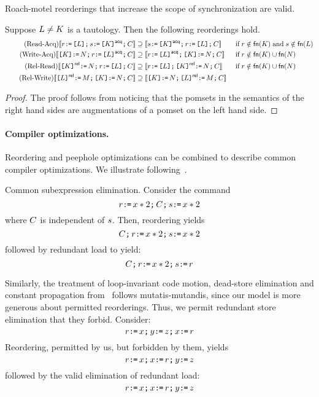 Roach-motel reorderings that increase the scope of synchronization are valid.
\begin{lemma}%
  Suppose $L\neq K$ is a tautology.  Then the following reorderings hold.
  \begin{align*}
    \tag{Read-Acq}
    \llbracket r \texttt{:}\mkern-1mu\texttt{=}\, \texttt{[}L\texttt{]} \texttt{;}\, s \texttt{:}\mkern-1mu\texttt{=}\, \texttt{[}K\texttt{]}^{\mathsf{acq}} \texttt{;}\, C\rrbracket &\supseteq
    \llbracket s \texttt{:}\mkern-1mu\texttt{=}\, \texttt{[}K\texttt{]}^{\mathsf{acq}}\texttt{;}\, r \texttt{:}\mkern-1mu\texttt{=}\, \texttt{[}L\texttt{]} \texttt{;}\, C\rrbracket
&&\;\allowbreak\text{if}\allowbreak\; r\notin\mathsf{fn}(K) \;\allowbreak\text{and}\allowbreak\; s\notin\mathsf{fn}(L)
    \\
    \tag{Write-Acq} 
    \llbracket\texttt{[}K\texttt{]} \texttt{:}\mkern-1mu\texttt{=}\, N \texttt{;}\,r \texttt{:}\mkern-1mu\texttt{=}\, \texttt{[}L\texttt{]}^{\mathsf{acq}} \texttt{;}\,C\rrbracket &\supseteq
    \llbracket r \texttt{:}\mkern-1mu\texttt{=}\, \texttt{[}L\texttt{]}^{\mathsf{acq}}  \texttt{;}\, \texttt{[}K\texttt{]}\texttt{:}\mkern-1mu\texttt{=}\, N \texttt{;}\, C\rrbracket 
    &&\;\allowbreak\text{if}\allowbreak\; r\notin\mathsf{fn}(K) \cup\mathsf{fn}(N)
    \\
\tag{Rel-Read} 
\llbracket\texttt{[}K\texttt{]}^{\mathsf{rel}} \texttt{:}\mkern-1mu\texttt{=}\, N \texttt{;}\,r \texttt{:}\mkern-1mu\texttt{=}\, \texttt{[}L\texttt{]} \texttt{;}\, C\rrbracket &\supseteq
    \llbracket r \texttt{:}\mkern-1mu\texttt{=}\, \texttt{[}L\texttt{]} \texttt{;}\, \texttt{[}K\texttt{]}^{\mathsf{rel}} \texttt{:}\mkern-1mu\texttt{=}\, N \texttt{;}\, C\rrbracket
   &&\;\allowbreak\text{if}\allowbreak\; r\notin\mathsf{fn}(K) \cup\mathsf{fn}(N)
    \\
    \tag{Rel-Write}
    \llbracket\texttt{[}L\texttt{]}^{\mathsf{rel}} \texttt{:}\mkern-1mu\texttt{=}\, M \texttt{;}\, \texttt{[}K\texttt{]} \texttt{:}\mkern-1mu\texttt{=}\, N \texttt{;}\, C\rrbracket &\supseteq
    \llbracket\texttt{[}K\texttt{]} \texttt{:}\mkern-1mu\texttt{=}\, N \texttt{;}\, \texttt{[}L\texttt{]}^{\mathsf{rel}} \texttt{:}\mkern-1mu\texttt{=}\, M \texttt{;}\, C\rrbracket
  \end{align*}
\begin{proof}
The proof follows from noticing that the pomsets in the semantics of the right hand sides are augmentations of a pomset on the left hand side.  
\end{proof}
\end{lemma}

\paragraph*{Compiler optimizations.} Reordering and peephole optimizations can be combined to describe common  compiler optimizations.  We illustrate following~\citet{Dolan:2018:BDR:3192366.3192421}.

Common subexpression elimination. Consider the command 
\[ r \texttt{:}\mkern-1mu\texttt{=}\, x *2  \texttt{;}\, C \texttt{;}\, s \texttt{:}\mkern-1mu\texttt{=}\, x * 2 \]
where $C$ is independent of $s$.  Then, reordering yields
\[C \texttt{;}\, r \texttt{:}\mkern-1mu\texttt{=}\, x *2  \texttt{;}\,  s \texttt{:}\mkern-1mu\texttt{=}\, x * 2 \]
followed by redundant load to yield:
\[C \texttt{;}\, r \texttt{:}\mkern-1mu\texttt{=}\, x * 2 \texttt{;}\,  s \texttt{:}\mkern-1mu\texttt{=}\, r\]

Similarly, the treatment of loop-invariant code motion, dead-store elimination and constant propagation from~\citet{Dolan:2018:BDR:3192366.3192421} follows mutatis-mutandis, since our model is more generous about permitted reorderings.  Thus, we permit  redundant store elimination that they forbid.
Consider:
\[ r \texttt{:}\mkern-1mu\texttt{=}\, x \texttt{;}\, y \texttt{:}\mkern-1mu\texttt{=}\, z  \texttt{;}\, x \texttt{:}\mkern-1mu\texttt{=}\, r \]
Reordering, permitted by us, but forbidden by them, yields
\[ r \texttt{:}\mkern-1mu\texttt{=}\, x \texttt{;}\, x \texttt{:}\mkern-1mu\texttt{=}\, r \texttt{;}\, y \texttt{:}\mkern-1mu\texttt{=}\, z  \]
followed by the valid elimination of redundant load:
\[ r \texttt{:}\mkern-1mu\texttt{=}\, x \texttt{;}\, x \texttt{:}\mkern-1mu\texttt{=}\, r \texttt{;}\, y \texttt{:}\mkern-1mu\texttt{=}\, z  \]

